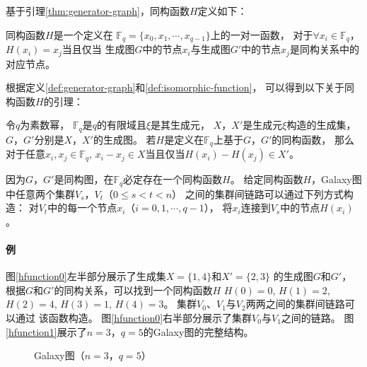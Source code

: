 基于引理\ref{thm:generator-graph}，同构函数$H$定义如下：
\begin{definition}\label{def:isomorphic-function}
  同构函数$H$是一个定义在
  $\mathds{F}_q = \{x_{0}, x_{1}, \cdots, x_{q-1}\}$上的一对一函数，
  对于$\forall x_i \in \mathds{F}_q$，$H(x_i) = x_j$当且仅当
  生成图$G$中的节点$x_i$与生成图$G'$中的节点$x_j$是同构关系中的对应节点。
\end{definition}

根据定义\ref{def:generator-graph}和\ref{def:isomorphic-function}，
可以得到以下关于同构函数$H$的引理：
\begin{lemma}\label{thm:isomorphic-function}
  令$q$为素数幂，
  $\mathds{F}_q$是$q$的有限域且$\xi$是其生成元，
  $X$，$X'$是生成元$\xi$构造的生成集，
  $G$，$G'$分别是$X$，$X'$的生成图。
  若$H$是定义在$\mathds{F}_q$上基于$G$，$G'$的同构函数，
  那么对于任意$x_i, x_j \in \mathds{F}_q$,
  $x_i - x_j \in X$当且仅当$H(x_i) - H(x_j) \in X'$。
\end{lemma}

因为$G$，$G'$是同构图，在$\mathds{F}_q$必定存在一个同构函数$H$。
给定同构函数$H$，Galaxy图中任意两个集群$V_s$，$V_t$（$0 \leq s < t < n$）
之间的集群间链路可以通过下列方式构造：
对$V_t$中的每一个节点$x_i$（$i = 0, 1, \cdots, q-1$），
将$x_i$连接到$V_s$中的节点$H(x_i)$。

\paragraph{例}
图\ref{hfunction0}左半部分展示了生成集$X=\{1,4\}$和$X'=\{2,3\}$
的生成图$G$和$G'$，
根据$G$和$G'$的同构关系，可以找到一个同构函数$H$
$H(0) = 0$, $H(1) = 2$, $H(2) = 4$, $H(3) = 1$, $H(4) = 3$。
集群$V_0$、$V_1$与$V_2$两两之间的集群间链路可以通过
该函数构造。
图\ref{hfunction0}右半部分展示了集群$V_0$与$V_1$之间的链路。
图\ref{hfunction1}展示了$n=3$，$q=5$的Galaxy图的完整结构。

\begin{figure}[htp]
  \centering
  \begin{minipage}[t]{\textwidth}
    \centering
    \hspace{.5cm}
    \subfloat[集群间链路]{
      \texttt{[image: gg]}
      \label{hfunction0}
    }
    \hspace{.5cm}
    \caption{Galaxy图（$n=3$，$q=5$）}
    \label{hfunction}
  \end{minipage}
\end{figure}

